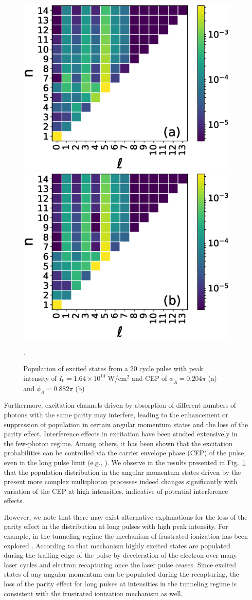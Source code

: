 \begin{figure}[h!]
\centering
\includegraphics[width=0.49\columnwidth]{figs/Rydberg/heat_cep_test_0p102_20_cyc_16p4e13.eps}
\includegraphics[width=0.49\columnwidth]{figs/Rydberg/heat_cep_test_0p441_20_cyc_16p4e13.eps}
\caption{\label{fig:CEP_Effects_20_cyc}
Population of excited states from a 20 cycle pulse with peak intensity of $I_0 = 1.64 \times 10^{14}$ W/cm$^2$ and CEP of $\phi_A=0.204\pi$ (a) and $\phi_A=0.882\pi$ (b)}.
\end{figure}

Furthermore, excitation channels driven by absorption of different numbers of photons with the same parity may interfere, leading to the enhancement or suppression of population in certain angular momentum states and the loss of the parity effect. Interference effects in excitation have been studied extensively in the few-photon regime. Among others, it has been shown that the excitation probabilities can be controlled via the carrier envelope phase (CEP) of the pulse, even in the long pulse limit (e.g., \cite{Zhao13,Zhao14}). We observe in the results presented in Fig.\ \ref{fig:CEP_Effects_20_cyc} that the population distribution in the angular momentum states driven by the present more complex multiphoton processes indeed changes significantly with variation of the CEP at high intensities, indicative of potential interference effects.

However, we note that there may exist alternative explanations for the loss of the parity effect in the distribution at long pulses with high peak intensity. For example, in the tunneling regime the mechanism of frustrated ionization has been explored \cite{nubbemeyer09}. According to that mechanism highly excited states are populated during the trailing edge of the pulse by deceleration of the electron over many laser cycles and electron recapturing once the laser pulse ceases. Since excited states of any angular momentum can be populated during the recapturing, the loss of the parity effect for long pulses at intensities in the tunneling regime is consistent with the frustrated ionization mechanism as well.


